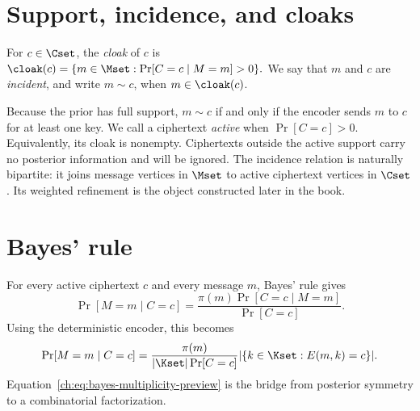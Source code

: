 \section{Support, incidence, and cloaks}
\begin{definition}\label{ch:def:cloak}
For $c\in\Cset$, the \emph{cloak} of $c$ is $\cloak(c)=\{m\in\Mset:\Pr[C=c\mid M=m]>0\}.$ We say that $m$ and $c$ are \emph{incident}, and write $m\sim c$, when $m\in\cloak(c)$.
\end{definition}
Because the prior has full support, $m\sim c$ if and only if the encoder sends $m$ to $c$ for at least one key. We call a ciphertext \emph{active} when $\Pr[C=c]>0$. Equivalently, its cloak is nonempty. Ciphertexts outside the active support carry no posterior information and will be ignored.
The incidence relation is naturally bipartite: it joins message vertices in $\Mset$ to active ciphertext vertices in $\Cset$. Its weighted refinement is the object constructed later in the book.
\section{Bayes' rule}
For every active ciphertext $c$ and every message $m$, Bayes' rule gives
\begin{equation}\label{ch:eq:bayes}
  \Pr[M=m\mid C=c]
  =\frac{\pi(m)\Pr[C=c\mid M=m]}{\Pr[C=c]}.
\end{equation}
Using the deterministic encoder, this becomes
\begin{equation}\label{ch:eq:bayes-multiplicity-preview}
  \Pr[M=m\mid C=c]
  =\frac{\pi(m)}{|\Kset|\Pr[C=c]}
    |\{k\in\Kset:E(m,k)=c\}|.
\end{equation}
Equation~\eqref{ch:eq:bayes-multiplicity-preview} is the bridge from posterior symmetry to a combinatorial factorization.
